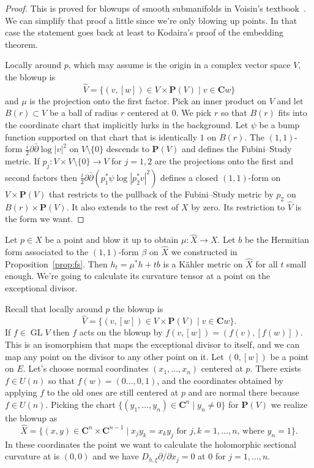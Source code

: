 \documentclass[10pt,a4paper]{amsart}
\newcommand{\kk}[1]{\mathbf{#1}}
\def\CC{\mathbf{C}}
\def\fs{b}
\DeclareMathOperator{\GL}{GL}
\def\hsc{holomorphic sectional curvature}
\def\bl#1{\widehat{#1}}
\begin{document}
\begin{proof}
This is proved for blowups of smooth submanifolds in
Voisin's textbook~\cite{voisin2002theorie}.
We can simplify that proof a little since we're only blowing up points.
In that case the statement goes back at least to Kodaira's proof of the
embedding theorem.


Locally around $p$, which may assume is the origin in a complex vector space
$V$, the blowup is
$$
\bl V
= \{ (v,[w]) \in V \times \kk P(V) \mid v \in \CC w \}
$$
and $\mu$ is the projection onto the first factor.
Pick an inner product on $V$ and let $B(r) \subset V$ be a ball of radius $r$
centered at $0$.
We pick $r$ so that $B(r)$ fits into the coordinate chart that implicitly lurks
in the background.
Let $\psi$ be a bump function supported on that chart that is identically $1$
on $B(r)$.
The $(1,1)$-form $\frac i2 \partial\bar\partial \log |v|^2$ on $V \setminus
\{0\}$ descends to $\kk P(V)$ and defines the Fubini--Study metric.
If $p_j : V \times V \setminus \{0\} \to V$ for $j = 1,2$ are the projections
onto the first and second factors then
$\frac i2 \partial \bar\partial (p_1^*\psi \log |p_2^*v|^2)$
defines a closed $(1,1)$-form on $V \times \kk P(V)$ that restricts to the
pullback of the Fubini--Study metric by $p_2$ on $B(r) \times \kk P(V)$.
It also extends to the rest of $X$ by zero.
Its restriction to $\bl V$ is the form we want.
\end{proof}




Let $p \in X$ be a point and blow it up to obtain $\mu : \bl X \to X$.
Let $\fs$ be the Hermitian form associated to the $(1,1)$-form $\beta$ on $\bl X$
we constructed in Proposition~\ref{prop:fs}.
Then $h_t = \mu^*h + t \fs$ is a K\"ahler metric on $\bl X$ for all $t$ small
enough.
We're going to calculate its curvature tensor at a point on the exceptional
divisor.

Recall that locally around $p$ the blowup is
$$
\bl V
= \{ (v,[w]) \in V \times \kk P(V) \mid v \in \CC w \}.
$$
If $f \in \GL V$ then $f$ acts on the blowup by $f(v, [w]) = (f(v), [f(w)])$.
This is an isomorphism that maps the exceptional divisor to itself, and we can
map any point on the divisor to any other point on it.
Let $(0, [w])$ be a point on $E$.
Let's choose normal coordinates $(x_1,\ldots,x_n)$ centered at $p$.
There exists $f \in U(n)$ so that $f(w) = (0 \ldots, 0, 1)$, and the
coordinates obtained by applying $f$ to the old ones are still centered at $p$
and are normal there because $f \in U(n)$.
Picking the chart $\{(y_1, \ldots, y_n) \in \CC^n \mid y_n \not= 0 \}$ for
$\kk P(V)$
we realize the blowup as
$$
\bl X
= \{ (x,y) \in \CC^n \times \CC^{n-1}
\mid x_j y_k = x_k y_j \text{ for $j,k = 1,\ldots,n$, where $y_n = 1$}  \}.
$$
In these coordinates the point we want to calculate the \hsc{} at is $(0,0)$
and we have $D_{h,\xi} \partial / \partial x_j = 0$ at $0$ for $j = 1, \ldots, n$.
\end{document}
